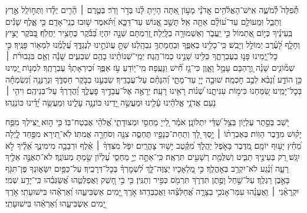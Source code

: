 \documentclass[twoside, openany, parskip=half, 11pt]{book}
\begin{document}
\begin{narrow}
תְּ֯פִלָּה֮ לְ֯מֹשֶׁ֢ה אִֽישׁ־הָאֱלֹ֫הִ֥ים \hfill \break
אֲֽדֹנָ֗י מָע֣וֹן אַ֭תָּה הָיִ֥יתָ לָּ֗נוּ בְּדֹ֣ר וָדֹֽר׃
בְּטֶ֤רֶם ׀ הָ֘רִ֤ים יֻלָּ֗דוּ וַתְּח֣וֹלֵֽל אֶ֣רֶץ וְתֵבֵ֑ל וּֽמֵעוֹלָ֥ם עַד־ע֝וֹלָ֗ם אַתָּ֥ה אֵֽל׃
תָּשֵׁ֣ב אֱ֭נוֹשׁ עַד־דַּכָּ֑א וַ֝תֹּ֗אמֶר שׁ֣וּבוּ בְנֵֽי־אָדָֽם׃
כִּ֤י אֶ֪לֶף שָׁנִ֡ים בְּֽעֵינֶ֗יךָ כְּי֣וֹם אֶ֭תְמוֹל כִּ֣י יַֽעֲבֹ֑ר וְאַשְׁמוּרָ֥ה בַלָּֽיְלָה׃
זְ֭רַמְתָּם שֵׁנָ֣ה יִהְי֑וּ בַּ֝בֹּ֗קֶר כֶּחָצִ֥יר יַחֲלֹֽף׃
בַּ֭בֹּקֶר יָצִ֣יץ וְחָלָ֑ף לָ֝עֶ֗רֶב יְמוֹלֵ֥ל וְיָבֵֽשׁ׃
כִּֽי־כָלִ֥ינוּ בְאַפֶּ֑ךָ וּֽבַחֲמָתְךָ֥ נִבְהָֽלְנוּ׃
שַׁתָּ֣ עֲוֺנֹתֵ֣ינוּ לְנֶגְדֶּ֑ךָ עֲ֝לֻמֵ֗נוּ לִמְא֥וֹר פָּנֶֽיךָ׃
כִּ֣י כׇל־יָ֭מֵינוּ פָּנ֣וּ בְעֶבְרָתֶ֑ךָ כִּלִּ֖ינוּ שָׁנֵ֣ינוּ כְמוֹ־הֶֽגֶה׃
יְמֵֽי־שְׁנוֹתֵ֨ינוּ בָהֶ֥ם שִׁבְעִ֪ים שָׁנָ֡ה וְאִ֤ם בִּגְבוּרֹ֨ת ׀ שְׁמ֘וֹנִ֤ים שָׁנָ֗ה וְ֭רׇהְבָּם עָמָ֣ל וָאָ֑וֶן כִּי־גָ֥ז חִ֗֝ישׁ וַנָּעֻֽפָה׃
מִֽי־י֭וֹדֵעַ עֹ֣ז אַפֶּ֑ךָ וּ֝כְיִרְאָתְךָ֗ עֶבְרָתֶֽךָ׃
לִמְנ֣וֹת יָ֭מֵינוּ כֵּ֣ן הוֹדַ֑ע וְ֝נָבִ֗א לְבַ֣ב חׇכְמָֽה׃
שׁוּבָ֣ה יְיָ֭ עַד־מָתָ֑י וְ֝הִנָּחֵ֗ם עַל־עֲבָדֶֽיךָ׃
שַׂבְּעֵ֣נוּ בַבֹּ֣קֶר חַסְדֶּ֑ךָ וּֽנְרַנְּנָ֥ה וְ֝נִשְׂמְחָ֗ה בְּכׇל־יָמֵֽינוּ׃
שַׂ֭מְּחֵנוּ כִּימ֣וֹת עִנִּיתָ֑נוּ שְׁ֝נ֗וֹת רָאִ֥ינוּ רָעָֽה׃
יֵרָאֶ֣ה אֶל־עֲבָדֶ֣יךָ פׇעֳלֶ֑ךָ וַ֝הֲדָרְךָ֗ עַל־בְּנֵיהֶֽם׃
וִיהִ֤י ׀ נֹ֤עַם אֲדֹנָ֥י אֱלֹהֵ֗ינוּ עָ֫לֵ֥ינוּ וּמַעֲשֵׂ֣ה יָ֭דֵינוּ כּוֹנְנָ֥ה עָלֵ֑ינוּ וּֽמַעֲשֵׂ֥ה יָ֝דֵ֗ינוּ כּוֹנְנֵֽהוּ׃


יֹ֭שֵׁב בְּסֵ֣תֶר עֶלְי֑וֹן
\hfill בְּצֵ֥ל שַׁ֝דַּ֗י יִתְלוֹנָֽן׃
אֹמַ֗ר לַ֭ייָ מַחְסִ֣י וּמְצוּדָתִ֑י אֱ֝לֹהַ֗י אֶבְטַח־בּֽוֹ׃
כִּ֤י ה֣וּא יַ֭צִּילְךָ מִפַּ֥ח יָק֗וּשׁ מִדֶּ֥בֶר הַוּֽוֹת׃
בְּאֶבְרָת֨וֹ ׀ יָ֣סֶךְ לָ֭ךְ וְתַחַת־כְּנָפָ֣יו תֶּחְסֶ֑ה צִנָּ֖ה וְסֹחֵרָ֣ה אֲמִתּֽוֹ׃
לֹֽא־תִ֭ירָא מִפַּ֣חַד לָ֑יְלָה מֵ֝חֵ֗ץ יָע֥וּף יוֹמָֽם׃
מִ֭דֶּבֶר בָּאֹ֣פֶל יַהֲלֹ֑ךְ מִ֝קֶּ֗טֶב יָשׁ֥וּד צׇהֳרָֽיִם׃
יִפֹּ֤ל מִצִּדְּךָ֨ ׀ אֶ֗לֶף וּרְבָבָ֥ה מִימִינֶ֑ךָ אֵ֝לֶ֗יךָ לֹ֣א יִגָּֽשׁ׃
רַ֭ק בְּעֵינֶ֣יךָ תַבִּ֑יט וְשִׁלֻּמַ֖ת רְשָׁעִ֣ים תִּרְאֶֽה׃
כִּֽי־אַתָּ֣ה יְיָ֣ מַחְסִ֑י עֶ֝לְי֗וֹן שַׂ֣מְתָּ מְעוֹנֶֽךָ׃
לֹא־תְאֻנֶּ֣ה אֵלֶ֣יךָ רָעָ֑ה וְ֝נֶ֗גַע לֹא־יִקְרַ֥ב בְּאׇהֳלֶֽךָ׃
כִּ֣י מַ֭לְאָכָיו יְצַוֶּה־לָּ֑ךְ לִ֝שְׁמׇרְךָ֗ בְּכׇל־דְּרָכֶֽיךָ׃
עַל־כַּפַּ֥יִם יִשָּׂא֑וּנְךָ פֶּן־תִּגֹּ֖ף בָּאֶ֣בֶן רַגְלֶֽךָ׃
עַל־שַׁ֣חַל וָפֶ֣תֶן תִּדְרֹ֑ךְ תִּרְמֹ֖ס כְּפִ֣יר וְתַנִּֽין׃
כִּ֤י בִ֣י חָ֭שַׁק וַאֲפַלְּטֵ֑הוּ אֲ֝שַׂגְּבֵ֗הוּ כִּֽי־יָדַ֥ע שְׁמִֽי׃
יִקְרָאֵ֨נִי ׀ וְֽאֶעֱנֵ֗הוּ עִמּֽוֹ־אָנֹכִ֥י בְצָרָ֑ה אֲ֝חַלְּצֵ֗הוּ וַאֲכַבְּדֵֽהוּ׃
אֹ֣רֶךְ יָ֭מִים אַשְׂבִּיעֵ֑הוּ וְ֝אַרְאֵ֗הוּ בִּישׁוּעָתִֽי׃
\scriptsize{אֹ֣רֶךְ יָ֭מִים אַשְׂבִּיעֵ֑הוּ וְ֝אַרְאֵ֗הוּ בִּישׁוּעָתִֽי׃ }
\normalsize{}


\end{narrow}
\end{document}
